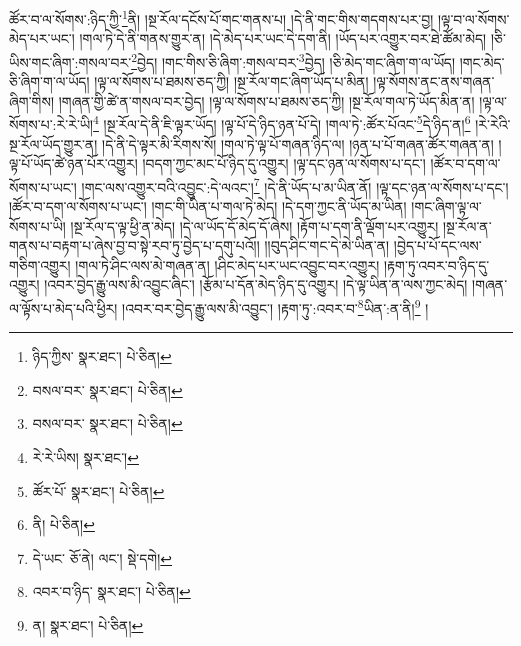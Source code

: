 ཚོར་བ་ལ་སོགས་:ཉིད་ཀྱི་\footnote{ཉིད་ཀྱིས་  སྣར་ཐང་།  པེ་ཅིན། }ནི། །སྔ་རོལ་དངོས་པོ་གང་གནས་པ། །དེ་ནི་གང་གིས་གདགས་པར་བྱ། །ལྟ་བ་ལ་སོགས་མེད་པར་ཡང་། །གལ་ཏེ་དེ་ནི་གནས་གྱུར་ན། །དེ་མེད་པར་ཡང་དེ་དག་ནི། །ཡོད་པར་འགྱུར་བར་ཐེ་ཚོམ་མེད། །ཅི་ཡིས་གང་ཞིག་:གསལ་བར་\footnote{བསལ་བར་  སྣར་ཐང་།  པེ་ཅིན། }བྱེད། །གང་གིས་ཅི་ཞིག་:གསལ་བར་\footnote{བསལ་བར་  སྣར་ཐང་།  པེ་ཅིན། }བྱེད། །ཅི་མེད་གང་ཞིག་ག་ལ་ཡོད། །གང་མེད་ཅི་ཞིག་ག་ལ་ཡོད། །ལྟ་ལ་སོགས་པ་ཐམས་ཅད་ཀྱི། །སྔ་རོལ་གང་ཞིག་ཡོད་པ་མིན། །ལྟ་སོགས་ནང་ནས་གཞན་ཞིག་གིས། །གཞན་གྱི་ཚེ་ན་གསལ་བར་བྱེད། །ལྟ་ལ་སོགས་པ་ཐམས་ཅད་ཀྱི། །སྔ་རོལ་གལ་ཏེ་ཡོད་མིན་ན། །ལྟ་ལ་སོགས་པ་:རེ་རེ་ཡི།\footnote{རེ་རེ་ཡིས།  སྣར་ཐང་། } །སྔ་རོལ་དེ་ནི་ཇི་ལྟར་ཡོད། །ལྟ་པོ་དེ་ཉིད་ཉན་པོ་དེ། །གལ་ཏེ་:ཚོར་པོའང་\footnote{ཚོར་པོ་  སྣར་ཐང་།  པེ་ཅིན། }དེ་ཉིད་ན།\footnote{ནི།  པེ་ཅིན། } །རེ་རེའི་སྔ་རོལ་ཡོད་གྱུར་ན། །དེ་ནི་དེ་ལྟར་མི་རིགས་སོ། །གལ་ཏེ་ལྟ་པོ་གཞན་ཉིད་ལ། །ཉན་པ་པོ་གཞན་ཚོར་གཞན་ན། །ལྟ་པོ་ཡོད་ཚེ་ཉན་པོར་འགྱུར། །བདག་ཀྱང་མང་པོ་ཉིད་དུ་འགྱུར། །ལྟ་དང་ཉན་ལ་སོགས་པ་དང་། །ཚོར་བ་དག་ལ་སོགས་པ་ཡང་། །གང་ལས་འགྱུར་བའི་འབྱུང་:དེ་ལའང་།\footnote{དེ་ཡང་  ཅོ་ནེ། ལང་།  སྡེ་དགེ། } །དེ་ནི་ཡོད་པ་མ་ཡིན་ནོ། །ལྟ་དང་ཉན་ལ་སོགས་པ་དང་། །ཚོར་བ་དག་ལ་སོགས་པ་ཡང་། །གང་གི་ཡིན་པ་གལ་ཏེ་མེད། །དེ་དག་ཀྱང་ནི་ཡོད་མ་ཡིན། །གང་ཞིག་ལྟ་ལ་སོགས་པ་ཡི། །སྔ་རོལ་ད་ལྟ་ཕྱི་ན་མེད། །དེ་ལ་ཡོད་དོ་མེད་དོ་ཞེས། །རྟོག་པ་དག་ནི་ལྡོག་པར་འགྱུར། །སྔ་རོལ་ན་གནས་པ་བརྟག་པ་ཞེས་བྱ་བ་སྟེ་རབ་ཏུ་བྱེད་པ་དགུ་པའོ།། །།བུད་ཤིང་གང་དེ་མེ་ཡིན་ན། །བྱེད་པ་པོ་དང་ལས་གཅིག་འགྱུར། །གལ་ཏེ་ཤིང་ལས་མེ་གཞན་ན། །ཤིང་མེད་པར་ཡང་འབྱུང་བར་འགྱུར། །རྟག་ཏུ་འབར་བ་ཉིད་དུ་འགྱུར། །འབར་བྱེད་རྒྱུ་ལས་མི་འབྱུང་ཞིང་། །རྩོམ་པ་དོན་མེད་ཉིད་དུ་འགྱུར། །དེ་ལྟ་ཡིན་ན་ལས་ཀྱང་མེད། །གཞན་ལ་ལྟོས་པ་མེད་པའི་ཕྱིར། །འབར་བར་བྱེད་རྒྱུ་ལས་མི་འབྱུང་། །རྟག་ཏུ་:འབར་བ་\footnote{འབར་བ་ཉིད་  སྣར་ཐང་།  པེ་ཅིན། }ཡིན་:ན་ནི།\footnote{ན།  སྣར་ཐང་།  པེ་ཅིན། } །
